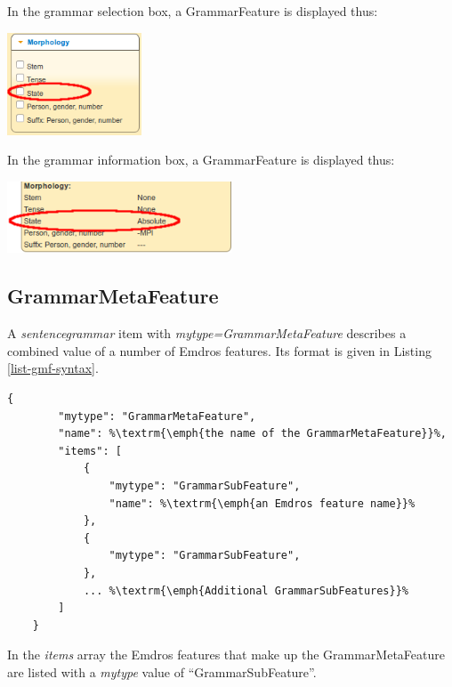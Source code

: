\documentclass[11pt,oneside,a4paper]{memoir}
\begin{document}
\Needspace*{5cm}%
In the grammar selection box, a GrammarFeature is displayed thus:

\begin{center}
  \includegraphics[width=0.3\textwidth]{state1.png}
\end{center}

\Needspace*{5cm}%
In the grammar information box, a GrammarFeature is displayed thus:

\begin{center}
  \includegraphics[width=0.5\textwidth]{state2.png}
\end{center}


\subsection{GrammarMetaFeature}\label{sec-grammarmetafeature}

A \emph{sentencegrammar} item with \emph{mytype=GrammarMetaFeature} describes a combined value of a
number of Emdros features. Its format is given in Listing \ref{list-gmf-syntax}.

\begin{lstlisting}[caption=GrammarMetaFeature syntax,label=list-gmf-syntax]
    {
        "mytype": "GrammarMetaFeature",
        "name": %\textrm{\emph{the name of the GrammarMetaFeature}}%,
        "items": [
            {
                "mytype": "GrammarSubFeature",
                "name": %\textrm{\emph{an Emdros feature name}}%
            },
            {
                "mytype": "GrammarSubFeature",
            },
            ... %\textrm{\emph{Additional GrammarSubFeatures}}%
        ]
    }
\end{lstlisting}

In the \emph{items} array the Emdros features that make up the GrammarMetaFeature are listed with a
\emph{mytype} value of ``GrammarSubFeature''.
\end{document}
